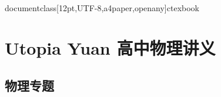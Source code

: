 \\documentclass[12pt,UTF-8,a4paper,openany]{ctexbook}\n\NeedsTeXFormat{LaTeX2e}
\numberwithin{figure}{section}
\theoremstyle{mystyle}
\theoremstyle{mystylekaishu}
\theoremstyle{mystyle}
\numberwithin{xiti}{section}
\begin{document}
%  
% 
% 
% 

\chapter{Utopia Yuan 高中物理讲义}
\section{物理专题}
\end{document}
